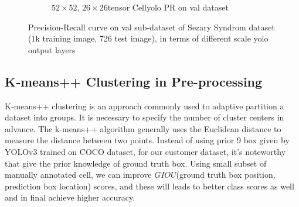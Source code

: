 \begin{figure}[h]
\begin{center}
\begin{subfigure}[b]{0.49\textwidth}
			\caption{$52 \times 52$, $26 \times 26$tensor Cellyolo PR on val dataset}
			\label{fig:cellnet}
		\end{subfigure}
	\end{center}
	\caption{Precision-Recall curve on val sub-dataset of Sezary Syndrom dataset (1k training image, 726 test image), in terms of different scale yolo output layers}
\end{figure}



\subsection{K‐means++ Clustering in Pre-processing}
K‐means++ clustering is an approach commonly used to adaptive partition a dataset into groups. It is necessary to specify the number of cluster centers in advance. The k‐means++ algorithm generally uses the Euclidean distance to measure the distance between two points. Instead of using prior 9 box given by YOLOv3 trained on COCO dataset, for our customer dataset, it's noteworthy that give the prior knowledge of ground truth box. Using small subset of manually annotated cell, we can improve $GIOU$(ground truth box position, prediction box location) scores, and these will leads to better class scores as well and in final achieve higher accuracy.

